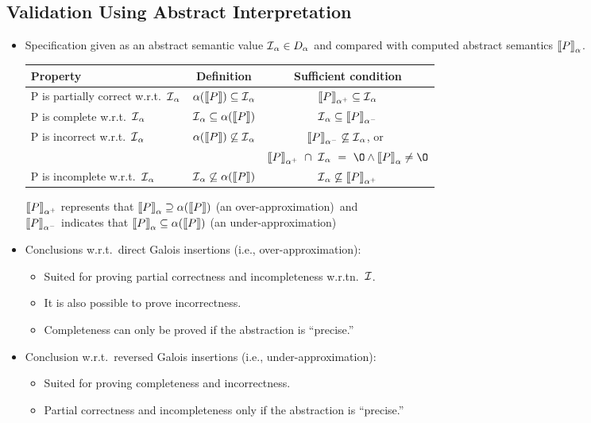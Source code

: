 \documentclass{article}
\renewcommand{\_}{\char'137}
\newcommand{\p}{{\sem{P}}}
\newcommand{\sem}[1]{\lsem #1 \rsem}
\newcommand{\lsem}{\mbox{$\lbrack\hspace{-0.3ex}\lbrack$}}
\newcommand{\rsem}{\mbox{$\rbrack\hspace{-0.3ex}\rbrack$}}
\newcommand{\I}{\mbox{$\cal I$}}
\begin{document}
\subsection{Validation Using Abstract Interpretation}
\begin{itemize}
\item Specification given as an abstract semantic value $\I_\alpha\in
  D_\alpha$ and compared with computed abstract semantics $\p_\alpha$.


\begin{tabular}{||l|c|c||}\hline\hline
     {\bf Property}& {\bf Definition}&{\bf Sufficient condition}
\\ \hline\hline
     P is partially  correct w.r.t.\ $\I_\alpha$& $ \alpha(\p) \subseteq 
     \I_\alpha$ &$ \p_{\alpha^+}
     \subseteq \I_\alpha$ \\
\hline
     P is complete w.r.t.\ $\I_\alpha$ & $\I_\alpha \subseteq 
\alpha(\p)$& $
\I_\alpha \subseteq \p_{\alpha^-}$ \\
\hline
     P is incorrect w.r.t.\ $\I_\alpha$ & $\alpha(\p) \not\subseteq \I_\alpha$
& $\p_{\alpha^-}
     \not\subseteq \I_\alpha$, or\ \\
 & & $\p_{\alpha^+}\ \cap\ \I_\alpha\ =\ \O \wedge \p_\alpha\neq\O$
\\ \hline
     P is incomplete w.r.t.\ $\I_\alpha$& $\I_\alpha \not\subseteq 
\alpha(\p)$
&$\I_\alpha
     \not\subseteq \p_{\alpha^+}$\\
 \hline\hline
\end{tabular}

$\sem{P}_{\alpha^+}$ represents that $\sem{P}_\alpha\supseteq
\alpha(\sem{P})$ (an over-approximation)\ and \\
$\sem{P}_{\alpha^-}$ indicates that $\sem{P}_\alpha\subseteq
\alpha(\sem{P})$ (an under-approximation)

\item Conclusions w.r.t.\ direct Galois insertions (i.e., over-approximation):
  \begin{itemize}
  \item Suited for proving partial correctness and incompleteness w.r.tn.\
    $\I$. 
  \item It is also possible to prove incorrectness.
  \item Completeness can only be proved if the abstraction is ``precise.''
  \end{itemize}
\item Conclusion w.r.t.\ reversed Galois insertions (i.e., under-approximation):  \begin{itemize}
  \item Suited for proving completeness and incorrectness.
  \item Partial correctness and incompleteness only if the abstraction is
    ``precise.''
  \end{itemize}
\end{itemize}
\end{document}
